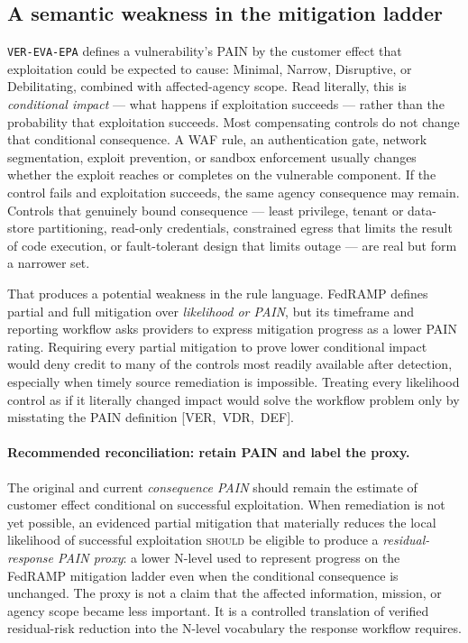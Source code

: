 \documentclass[11pt]{article}
\newcommand{\code}[1]{\texttt{#1}}
\newcommand{\rfckw}[1]{\textsc{#1}}
\begin{document}
\subsection{A semantic weakness in the mitigation ladder}
\label{sec:pain-proxy}
\code{VER-EVA-EPA} defines a vulnerability's PAIN by the customer effect that
exploitation could be expected to cause: Minimal, Narrow, Disruptive, or
Debilitating, combined with affected-agency scope. Read literally, this is
\emph{conditional impact} --- what happens if exploitation succeeds --- rather
than the probability that exploitation succeeds. Most compensating controls do
not change that conditional consequence. A WAF rule, an authentication gate,
network segmentation, exploit prevention, or sandbox enforcement usually changes
whether the exploit reaches or completes on the vulnerable component. If the
control fails and exploitation succeeds, the same agency consequence may remain.
Controls that genuinely bound consequence --- least privilege, tenant or
data-store partitioning, read-only credentials, constrained egress that limits
the result of code execution, or fault-tolerant design that limits outage --- are
real but form a narrower set.

That produces a potential weakness in the rule language. FedRAMP defines partial
and full mitigation over \emph{likelihood or PAIN}, but its timeframe and reporting
workflow asks providers to express mitigation progress as a lower PAIN rating.
Requiring every partial mitigation to prove lower conditional impact would deny
credit to many of the controls most readily available after detection, especially
when timely source remediation is impossible. Treating every likelihood control
as if it literally changed impact would solve the workflow problem only by
misstating the PAIN definition \mbox{[VER, VDR, DEF]}.

\paragraph{Recommended reconciliation: retain PAIN and label the proxy.}
The original and current \emph{consequence PAIN} should remain the estimate of
customer effect conditional on successful exploitation. When remediation is not
yet possible, an evidenced partial mitigation that materially reduces the local
likelihood of successful exploitation \rfckw{should} be eligible to produce a
\emph{residual-response PAIN proxy}: a lower N-level used to represent progress on
the FedRAMP mitigation ladder even when the conditional consequence is unchanged.
The proxy is not a claim that the affected information, mission, or agency scope
became less important. It is a controlled translation of verified residual-risk
reduction into the N-level vocabulary the response workflow requires.
\end{document}
